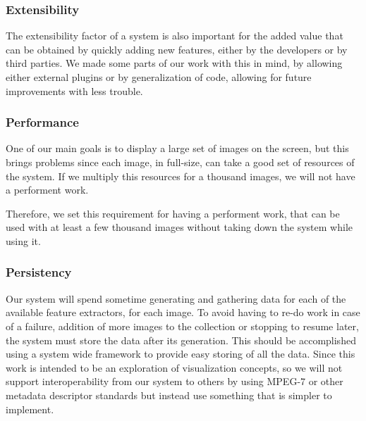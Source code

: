 


\subsubsection{Extensibility} %
\label{reqs:Extensibility}

The extensibility factor of a system is also important for the added value that can be obtained by quickly adding new features, either by the developers or by third parties. We made some parts of our work with this in mind, by allowing either external plugins or by generalization of code, allowing for future improvements with less trouble.




\subsubsection{Performance} %
\label{reqs:Performance}

One of our main goals is to display a large set of images on the screen, but this brings problems since each image, in full-size, can take a good set of resources of the system. If we multiply this resources for a thousand images, we will not have a performent work.

Therefore, we set this requirement for having a performent work, that can be used with at least a few thousand images without taking down the system while using it.




\subsubsection{Persistency}

Our system will spend sometime generating and gathering data for each of the available feature extractors, for each image. To avoid having to re-do work in case of a failure, addition of more images to the collection or stopping to resume later, the system must store the data after its generation. This should be accomplished using a system wide framework to provide easy storing of all the data. Since this work is intended to be an exploration of visualization concepts, so we will not support interoperability from our system to others by using MPEG-7 or other metadata descriptor standards but instead use something that is simpler to implement.


